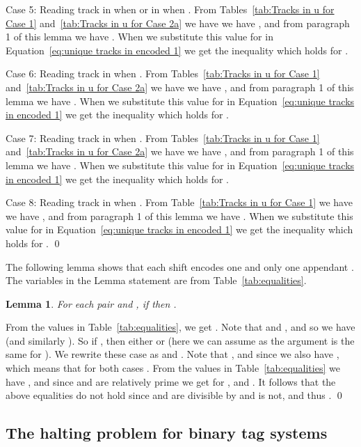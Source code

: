 \documentclass[11pt]{article} \usepackage{amsfonts,amsmath,amssymb,amsthm}
\renewenvironment{proof}{{\bfseries\noindent Proof.}}{\qed\vspace{3.5ex}}
\newtheorem{lemma}{Lemma}
\begin{document}
\begin{proof}
Case 5: Reading track  in  when  or in  when . From Tables~\ref{tab:Tracks in u for Case 1} and~\ref{tab:Tracks in u for Case 2a} we have we have , and from paragraph 1 of this lemma we have . When we substitute this value for  in Equation~\eqref{eq:unique tracks in encoded 1} we get the inequality  which holds for .


Case 6: Reading track  in  when . From Tables~\ref{tab:Tracks in u for Case 1} and~\ref{tab:Tracks in u for Case 2a} we have we have , and from paragraph 1 of this lemma we have . When we substitute this value for  in Equation~\eqref{eq:unique tracks in encoded 1} we get the inequality  which holds for .

Case 7: Reading track  in  when . From Tables~\ref{tab:Tracks in u for Case 1} and~\ref{tab:Tracks in u for Case 2a} we have we have , and from paragraph 1 of this lemma we have . When we substitute this value for  in Equation~\eqref{eq:unique tracks in encoded 1} we get the inequality  which holds for .


Case 8: Reading track  in  when . From Table~\ref{tab:Tracks in u for Case 1} we have we have , and from paragraph 1 of this lemma we have . When we substitute this value for  in Equation~\eqref{eq:unique tracks in encoded 1} we get the inequality  which holds for .
\end{proof}

The following lemma shows that each shift  encodes one and only one appendant .
The variables in the Lemma statement are from Table~\ref{tab:equalities}.
\begin{lemma}\label{lem:Encode appendant}
For each pair  and , if  then .
\end{lemma}
\begin{proof}
From the values in Table~\ref{tab:equalities}, we get . 
Note that  and ,  and so we have  (and similarly  ). 
So if , then either  or  (here we can assume  as the argument is the same for ).
We rewrite these case as  and . 
Note that , and since  we also have , which means that for both cases . 
From the values in Table~\ref{tab:equalities} we have , and since  and  are relatively prime we get  for ,  and . It follows that the above equalities do not hold since  and  are divisible by  and  is not, and thus .
\end{proof}


\subsection{The halting problem for binary tag systems}
\end{document}
